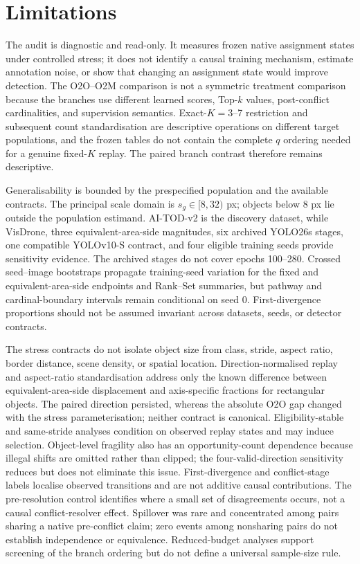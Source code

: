 \section{Limitations}

The audit is diagnostic and read-only. It measures frozen native assignment states under controlled stress; it does not identify a causal training mechanism, estimate annotation noise, or show that changing an assignment state would improve detection. The O2O--O2M comparison is not a symmetric treatment comparison because the branches use different learned scores, Top-$k$ values, post-conflict cardinalities, and supervision semantics. Exact-$K=3$--7 restriction and subsequent count standardisation are descriptive operations on different target populations, and the frozen tables do not contain the complete $q$ ordering needed for a genuine fixed-$K$ replay. The paired branch contrast therefore remains descriptive.

Generalisability is bounded by the prespecified population and the available contracts. The principal scale domain is $s_g\in[8,32)$ px; objects below 8 px lie outside the population estimand. AI-TOD-v2 is the discovery dataset, while VisDrone, three equivalent-area-side magnitudes, six archived YOLO26s stages, one compatible YOLOv10-S contract, and four eligible training seeds provide sensitivity evidence. The archived stages do not cover epochs 100--280. Crossed seed--image bootstraps propagate training-seed variation for the fixed and equivalent-area-side endpoints and Rank--Set summaries, but pathway and cardinal-boundary intervals remain conditional on seed 0. First-divergence proportions should not be assumed invariant across datasets, seeds, or detector contracts.

The stress contracts do not isolate object size from class, stride, aspect ratio, border distance, scene density, or spatial location. Direction-normalised replay and aspect-ratio standardisation address only the known difference between equivalent-area-side displacement and axis-specific fractions for rectangular objects. The paired direction persisted, whereas the absolute O2O gap changed with the stress parameterisation; neither contract is canonical. Eligibility-stable and same-stride analyses condition on observed replay states and may induce selection. Object-level fragility also has an opportunity-count dependence because illegal shifts are omitted rather than clipped; the four-valid-direction sensitivity reduces but does not eliminate this issue. First-divergence and conflict-stage labels localise observed transitions and are not additive causal contributions. The pre-resolution control identifies where a small set of disagreements occurs, not a causal conflict-resolver effect. Spillover was rare and concentrated among pairs sharing a native pre-conflict claim; zero events among nonsharing pairs do not establish independence or equivalence. Reduced-budget analyses support screening of the branch ordering but do not define a universal sample-size rule.

